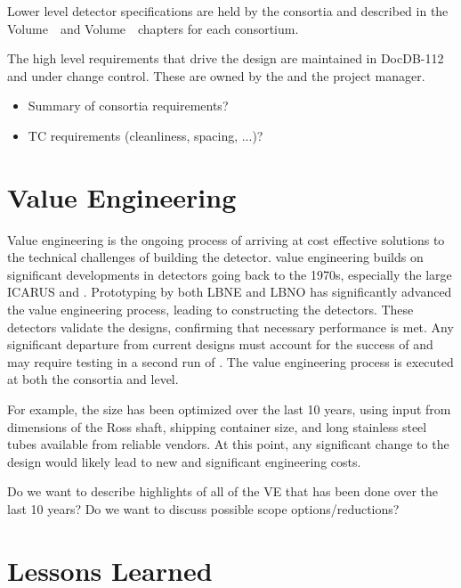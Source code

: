 Lower level detector specifications are held by the consortia and described in the   
Volume~\volnumbersp\ and  Volume~\volnumberdp\ chapters for
each consortium.

The high level  requirements that drive the  design are
maintained in DocDB-112 and under change control. These are owned by
the   and the  project manager.

\begin{itemize}
 \item Summary of consortia requirements?
 \item TC requirements (cleanliness,  spacing, ...)?
\end{itemize}


\section{Value Engineering}
\label{sec:fdsp-coord-ve}

Value engineering is the ongoing process of arriving at cost effective
solutions to the technical challenges of building the 
detector.  value engineering builds on significant
developments in  detectors going back to the 1970s, especially the large  ICARUS and
. Prototyping by both LBNE and LBNO has significantly
advanced the value engineering process, leading to constructing
the  detectors. These detectors validate the
 designs, confirming that necessary performance is
met. Any significant departure from current designs must account for
the success of  and may require testing in a second
run of . The value engineering process is executed
at both the consortia and  level.

For example, the  size has been optimized over the last 10 years,
using input from dimensions of the Ross shaft, shipping container size,
and long stainless steel tubes available from reliable vendors.
At this point, any significant change to the  design would likely
lead to new and significant engineering costs.

Do we want to describe highlights of all of the VE that has been done
over the last 10 years? Do we want to discuss possible scope options/reductions?

\section{Lessons Learned}
\label{sec:fdsp-coord-lessons}


